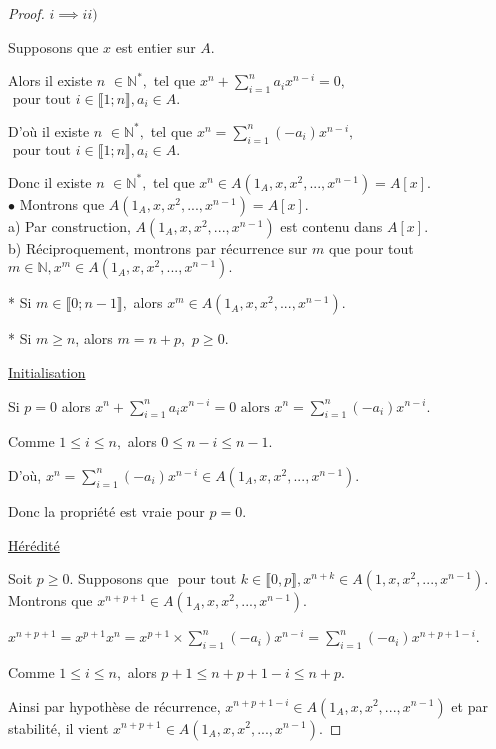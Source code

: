 \begin{proof}
	$i \implies ii)$
	
	Supposons que $x$ est entier sur $A.$
	
	Alors il existe $n$ $\in \mathbb{N}^{\ast },$ tel que $x^{n}+\sum\limits_{i=1}^{n}a_{i}x^{n-i}=0,$ $\text{ pour tout } i\in \llbracket 1; n \rrbracket ,a_{i}\in A.$
	
	D'où il existe $n$ $\in \mathbb{N}^{\ast },$ tel que $x^{n}=\sum\limits_{i=1}^{n}(-a_{i})x^{n-i},$ $\text{ pour tout } i\in \llbracket 1; n \rrbracket ,a_{i}\in A.$
	
	Donc il existe $n$ $\in \mathbb{N}^{\ast },$ tel que $x^{n}\in A(1_A,x,x^{2},...,x^{n-1})=A[x].$\\
	$\bullet$ Montrons que $A(1_A,x,x^{2},...,x^{n-1})=A[x].$\\
	a) Par construction, $A(1_A,x,x^{2},...,x^{n-1})$ est contenu dans $ A[x].$\\
	b) Réciproquement, montrons par récurrence sur $m$ que pour tout \\ $m	\in \mathbb{N},x^{m}\in A(1_A,x,x^{2},...,x^{n-1}).$
	
	* Si $m\in \llbracket 0; n-1 \rrbracket ,$ alors $x^{m}\in A(1_A,x,x^{2},...,x^{n-1}).$
	
	* Si $m\geq n$, alors $m=n+p,$ $p\geq 0.$
	
	\underline{Initialisation}
	
	Si $p=0$ alors  $x^{n}+\sum\limits_{i=1}^{n}a_{i}x^{n-i}=0\text{ alors }
	x^{n}=\sum\limits_{i=1}^{n}(-a_{i})x^{n-i}.$
	
	Comme $1\leq i\leq n,$ alors $0\leq n-i\leq n-1$.
	
	D'où, $x^{n}=\sum\limits_{i=1}^{n}(-a_{i})x^{n-i}\in
	A(1_A,x,x^{2},...,x^{n-1}).$
	
	Donc la propriété est vraie pour $p=0$.
	
	\underline{Hérédité}
	
	Soit $p\geq 0.$ Supposons que $\text{ pour tout } k\in \llbracket 0, p \rrbracket
	,x^{n+k}\in A(1,x,x^{2},...,x^{n-1})$.\\ Montrons que $x^{n+p+1}\in
	A(1_A,x,x^{2},...,x^{n-1}).$
	
	$x^{n+p+1}=x^{p+1}x^{n}=x^{p+1}\times
	\sum\limits_{i=1}^{n}(-a_{i})x^{n-i}=\sum\limits_{i=1}^{n}(-a_{i})x^{n+p+1-i}$.
	
	Comme $1\leq i\leq n,$ alors $p+1\leq n+p+1-i\leq n+p$.
	
	Ainsi par hypothèse de récurrence, $x^{n+p+1-i}\in
	A(1_A,x,x^{2},...,x^{n-1})$ et par stabilité, il vient $x^{n+p+1}\in
	A(1_A,x,x^{2},...,x^{n-1}).$
	

\end{proof}

